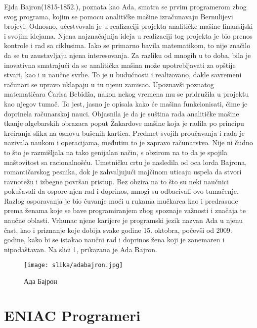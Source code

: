 \documentclass[a4paper,12pt]{article}
\begin{document}
\begin{flushleft}
    Ejda Bajron(1815-1852.), poznata kao Ada, smatra se prvim programerom zbog svog programa, kojim se pomocu analitičke mašine izračunavaju Bernulijevi brojevi. Odnosno, učestvovala je u realizaciji projekta analitičke mašine finansijski i svojim idejama. Njena najznačajnija ideja u realizaciji tog projekta je bio prenos kontrole i rad sa ciklusima. Iako se primarno bavila matematikom, to nije značilo da se tu zaustavljaju njena interesovanja. Za razliku od mnogih u to doba, bila je inovativna smatrajući da se analitička mašina može upotrebljavati za opštije stvari, kao i u naučne svrhe. To je u budućnosti i realizovano, dakle savremeni računari se upravo uklapaju u tu njenu zamisao. Upoznavši poznatog matematičara Čarlsa Bebidža, nakon nekog vremena mu se pridružila u projektu kao njegov tumač. To jest, jasno je opisala kako će mašina funkcionisati, čime je doprinela računarskoj nauci. Objasnila je da je suština rada analitičke mašine tkanje algebarskih obrazaca poput Žakardove mašine koja je radila po principu kreiranja slika na osnovu bušenih kartica. Predmet svojih proučavanja i rada je nazivala naukom i operacijama, međutim to je zapravo računarstvo. Nije ni čudno to što je razmišljala na tako genijalan način, s obzirom na to da je spojila maštovitost sa racionalnošću. Umetničku crtu je nasledila od oca lorda Bajrona, romantičarskog pesnika, dok je zahvaljujući majčinom uticaju uspela da stvori ravnotežu i izbegne površan pristup. Bez obzira na to što su neki naučnici pokušavali da ospore njen rad i doprinos, mnogi su odbacivali ovo tumačenje. Razlog osporavanja je bio čuvanje moći u rukama mučkarca kao i predrasude prema ženama koje se bave programiranjem zbog spoznaje važnosti i značaja te naučne oblasti. Vrhunac njene karijere je programski jezik nazvan Ada u njenu čast, kao i priznanje koje dobija svake godine 15. oktobra, počevši od 2009. godine, kako bi se istakao naučni rad i doprinos žena koji je zanemaren i nipodaštavan. Na slici 1, prikazana je Ada Bajron.
\end{flushleft}

\begin{figure}
    \centering
    \texttt{[image: slika/adabajron.jpg]}
    \caption{Ада Бајрон}
    \label{fig:my_label}
\end{figure}


\section{ENIAC Programeri}
\end{document}

